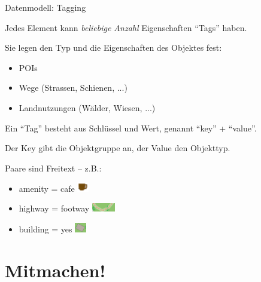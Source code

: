 \documentclass{beamer}
\begin{document}
\begin{frame}{Datenmodell: Tagging}

Jedes Element kann \emph{beliebige Anzahl} Eigenschaften "`Tags"' haben.

Sie legen den Typ und die Eigenschaften des Objektes fest:
\begin{itemize}
  \item POIs
  \item Wege (Strassen, Schienen, ...)
  \item Landnutzungen (Wälder, Wiesen, ...)
\end{itemize}

\pause

Ein "`Tag"' besteht aus Schlüssel und Wert, genannt "`key"' + "`value"'.

\pause

Der Key gibt die Objektgruppe an, der Value den Objekttyp.

 Paare sind Freitext -- z.B.:
\begin{itemize}
  \item amenity = cafe \includegraphics[width=0.5cm]{cafe.png}
  \item highway = footway \includegraphics[width=1cm]{footway.png}
  \item building = yes  \includegraphics[width=0.5cm]{building.png}
\end{itemize}

\end{frame}


\section{Mitmachen!}

\end{document}
